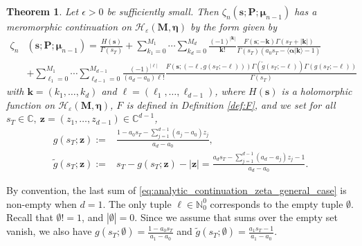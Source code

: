 \documentclass[a4paper,12pt]{article}
\newtheorem{thm}{Theorem}
\theoremstyle{definition}
\numberwithin{equation}{section}
\begin{document}
\begin{thm}
\label{th:analytic_continuation_zeta_general_case}
Let $\epsilon>0$ be sufficiently small. Then $\zeta_{n}(\mathbf{s};\mathbf{P};\boldsymbol{\mu}_{n-1})$ has a meromorphic continuation on $\mathcal{H}_{\varepsilon}(\mathbf{M},\boldsymbol{\eta})$ by the form given by
\begin{align}
    \zeta_{n}&(\mathbf{s};\mathbf{P};\boldsymbol{\mu}_{n-1})= \frac{H(\mathbf{s})}{\Gamma(s_T)}+ \sum_{k_1=0}^{M_1} \cdots \sum_{k_d=0}^{M_d} \frac{(-1)^{|\mathbf{k}|}}{\mathbf{k}!} \frac{F(\mathbf{s};-\mathbf{k})\Gamma(s_T+|\mathbf{k}|)}{\Gamma(s_T)(a_0s_T-\langle \boldsymbol{\alpha}|\mathbf{k}\rangle-1)} \label{eq:analytic_continuation_zeta_general_case} \\ 
    & +\sum_{\ell_1=0}^{M_1} \cdots \sum_{\ell_{d-1}=0}^{M_{d-1}} \frac{(-1)^{|\boldsymbol{\ell}|}}{(a_d-a_0)\boldsymbol{\ell}!} \frac{F(\mathbf{s};(-\boldsymbol{\ell},g(s_T;-\boldsymbol{\ell})))\Gamma(\widetilde{g}(s_T;-\boldsymbol{\ell}))\Gamma(g(s_T;-\boldsymbol{\ell}))}{\Gamma(s_T)} \nonumber
\end{align}
with $\mathbf{k}=(k_1,\ldots,k_d)$ and
$\boldsymbol{\ell}=(\ell_1,\ldots,\ell_{d-1})$,
where $H(\mathbf{s})$ is a holomorphic function on $\mathcal{H}_{\varepsilon}(\mathbf{M},\boldsymbol{\eta})$, $F$ is defined in Definition \ref{def:F}, and we set for all $s_T \in \mathbb{C}, \ \mathbf{z}=(z_1,\ldots,z_{d-1}) \in \mathbb{C}^{d-1}$,
\begin{align*}
    g(s_T;\mathbf{z}):=& \frac{1-a_0s_T-\sum_{j=1}^{d-1} (a_j-a_0)z_j}{a_d-a_0}, \\
    \widetilde{g}(s_T;\mathbf{z}):=& s_T-g(s_T;\mathbf{z})-|\mathbf{z}| = \frac{a_ds_T-\sum_{j=1}^{d-1} (a_d-a_j)z_j-1}{a_d-a_0}.
\end{align*}
\end{thm}

By convention, the last sum of \eqref{eq:analytic_continuation_zeta_general_case} is non-empty when $d=1$. The only tuple $\boldsymbol{\ell} \in \mathbb{N}_0^0$ corresponds to the empty tuple $\emptyset$. Recall that $\emptyset ! =1$, and $|\emptyset|=0$. Since we assume that sums over the empty set vanish, we also have $g(s_T;\emptyset)=\frac{1-a_0s_T}{a_1-a_0}$ and $\widetilde{g}(s_T;\emptyset)=\frac{a_1s_T-1}{a_1-a_0}$.
\end{document}

